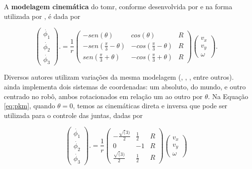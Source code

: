 A \textbf{modelagem cinemática} do \acrshort{tomr}, conforme desenvolvida por \cite{campion1996structural} e na forma utilizada por \cite{samani2007comprehensive}, é dada por

\begin{equation}
  \begin{pmatrix}
    \dot{\phi_1} \\
    \dot{\phi_2} \\
    \dot{\phi_3}
  \end{pmatrix}.
  =
  \frac{1}{r}
  \begin{pmatrix}
    -sen(\theta)               & cos(\theta)                & R \\
    -sen(\frac{\pi}{3}-\theta) & -cos(\frac{\pi}{3}-\theta) & R \\
    sen(\frac{\pi}{3}+\theta)  & -cos(\frac{\pi}{3}+\theta) & R
  \end{pmatrix}
  \begin{pmatrix}
    v_x \\
    v_y \\
    \omega
  \end{pmatrix}.
  \label{eq:pkm}
\end{equation}

Diversos autores utilizam variações da mesma modelagem (\cite{rojas2006holonomic}, \cite{ritter2016modelagem}, \cite{pin1994new}, entre outros). \cite{ritter2016modelagem} ainda implementa dois sistemas de coordenadas: um absoluto, do mundo, e outro centrado no robô, ambos rotacionados em relação um ao outro por $\theta$. Na Equação \ref{eq:pkm}, quando $\theta = 0$, temos as cinemáticas direta e inversa que pode ser utilizada para o controle das juntas, dadas por

\begin{equation}
  \begin{pmatrix}
    \dot{\phi_1} \\
    \dot{\phi_2} \\
    \dot{\phi_3}
  \end{pmatrix}.
  =
  \frac{1}{r}
  \begin{pmatrix}
    -\frac{\sqrt(3)}{2} & \frac{1}{2} & R \\
    0                   & -1          & R \\
    \frac{\sqrt(3)}{2}  & \frac{1}{2} & R
  \end{pmatrix}
  \begin{pmatrix}
    v_x \\
    v_y \\
    \omega
  \end{pmatrix}
  \label{eq:ik}
\end{equation}

